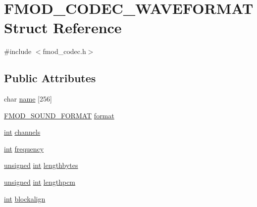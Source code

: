 \hypertarget{struct_f_m_o_d___c_o_d_e_c___w_a_v_e_f_o_r_m_a_t}{\section{F\-M\-O\-D\-\_\-\-C\-O\-D\-E\-C\-\_\-\-W\-A\-V\-E\-F\-O\-R\-M\-A\-T Struct Reference}
\label{struct_f_m_o_d___c_o_d_e_c___w_a_v_e_f_o_r_m_a_t}
}


{\ttfamily \#include $<$fmod\-\_\-codec.\-h$>$}

\subsection*{Public Attributes}
\begin{DoxyCompactItemize}
\item 
char \hyperlink{struct_f_m_o_d___c_o_d_e_c___w_a_v_e_f_o_r_m_a_t_a184ede024717b42f3df054aca4bf3ae5}{name} \mbox{[}256\mbox{]}
\item 
\hyperlink{fmod_8h_a6192ea5a963e6b24689b53e96a946833}{F\-M\-O\-D\-\_\-\-S\-O\-U\-N\-D\-\_\-\-F\-O\-R\-M\-A\-T} \hyperlink{struct_f_m_o_d___c_o_d_e_c___w_a_v_e_f_o_r_m_a_t_aced3a8f677c8663353851db51c43f581}{format}
\item 
\hyperlink{wglew_8h_a500a82aecba06f4550f6849b8099ca21}{int} \hyperlink{struct_f_m_o_d___c_o_d_e_c___w_a_v_e_f_o_r_m_a_t_aed37ce9c60c7cafb4b1335285a97d890}{channels}
\item 
\hyperlink{wglew_8h_a500a82aecba06f4550f6849b8099ca21}{int} \hyperlink{struct_f_m_o_d___c_o_d_e_c___w_a_v_e_f_o_r_m_a_t_a6a54a1b79daa79dc605d9145f04aaddb}{frequency}
\item 
\hyperlink{_free_image_8h_a425076c7067a1b5166e2cc530e914814}{unsigned} \hyperlink{wglew_8h_a500a82aecba06f4550f6849b8099ca21}{int} \hyperlink{struct_f_m_o_d___c_o_d_e_c___w_a_v_e_f_o_r_m_a_t_a2e9d8c283bfc9b69e9f6a22c04507e62}{lengthbytes}
\item 
\hyperlink{_free_image_8h_a425076c7067a1b5166e2cc530e914814}{unsigned} \hyperlink{wglew_8h_a500a82aecba06f4550f6849b8099ca21}{int} \hyperlink{struct_f_m_o_d___c_o_d_e_c___w_a_v_e_f_o_r_m_a_t_a0cccdeb82b13ac9342c24401c5a50f5f}{lengthpcm}
\item 
\hyperlink{wglew_8h_a500a82aecba06f4550f6849b8099ca21}{int} \hyperlink{struct_f_m_o_d___c_o_d_e_c___w_a_v_e_f_o_r_m_a_t_a46df2a2789c6c438cd773762ed397a6f}{blockalign}
\item 

\end{DoxyCompactItemize}
